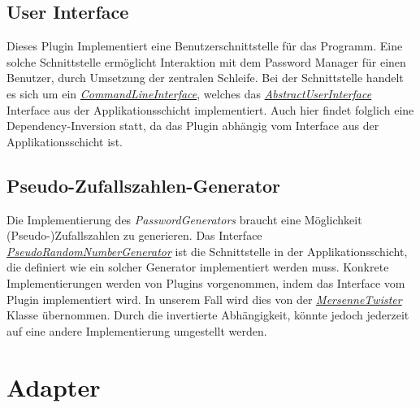 \subsection{User Interface}

Dieses Plugin Implementiert eine Benutzerschnittstelle für das Programm. Eine solche Schnittstelle ermöglicht Interaktion mit dem Password Manager für einen Benutzer, durch Umsetzung der zentralen Schleife. Bei der Schnittstelle handelt es sich um ein \href{https://github.com/moorts/Morik/blob/main/src/plugins/ui/CommandLineInterface.h}{\textit{CommandLineInterface}}, welches das \href{https://github.com/moorts/Morik/blob/main/src/application/AbstractUserInterface.h}{\textit{AbstractUserInterface}} Interface aus der Applikationsschicht implementiert. Auch hier findet folglich eine Dependency-Inversion statt, da das Plugin abhängig vom Interface aus der Applikationsschicht ist.

\subsection{Pseudo-Zufallszahlen-Generator}

Die Implementierung des \textit{PasswordGenerators} braucht eine Möglichkeit (Pseudo-)Zufallszahlen zu generieren. Das Interface \href{https://github.com/moorts/Morik/blob/main/src/application/PseudoRandomNumberGenerator.h}{\textit{PseudoRandomNumberGenerator}} ist die Schnittstelle in der Applikationsschicht, die definiert wie ein solcher Generator implementiert werden muss. Konkrete Implementierungen werden von Plugins vorgenommen, indem das Interface vom Plugin implementiert wird. In unserem Fall wird dies von der \href{https://github.com/moorts/Morik/blob/main/src/plugins/prng/MersenneTwister.h}{\textit{MersenneTwister}} Klasse übernommen. Durch die invertierte Abhängigkeit, könnte jedoch jederzeit auf eine andere Implementierung umgestellt werden.

\section{Adapter}
